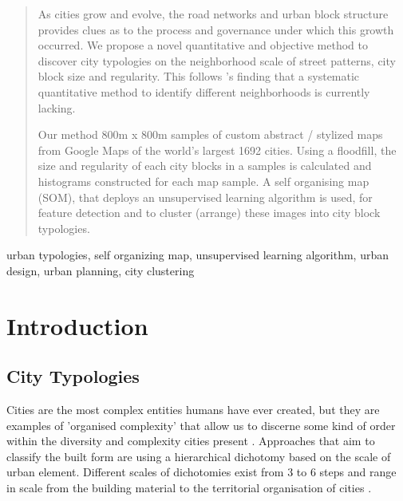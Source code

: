 \documentclass[final,3p,times,authoryear]{elsarticle}
\begin{document}
\begin{frontmatter}
\begin{abstract}
As cities grow and evolve, the road networks and urban block structure provides clues as to the process and governance under which this growth occurred. We propose a novel quantitative and objective method to discover city typologies on the neighborhood scale of street patterns, city block size and regularity. This follows \cite{Louf2014a}'s finding that a systematic quantitative method to identify different neighborhoods is currently lacking. 

Our method 800m x 800m samples of custom abstract / stylized maps from Google Maps of the world's largest 1692 cities. Using a floodfill, the size and regularity of each city blocks in a samples is calculated and histograms constructed for each map sample. A self organising map (SOM), that deploys an unsupervised learning algorithm is used, for feature detection and to cluster (arrange) these images into city block typologies. 


\end{abstract}

\begin{keyword}
urban typologies, self organizing map, unsupervised learning algorithm, urban design, urban planning, city clustering



\end{keyword}

\end{frontmatter}







\section{Introduction}\label{sec:introduction}


\subsection{City Typologies}\label{sec:introduction2}
Cities are the most complex entities humans have ever created, but they are examples of 'organised complexity' that allow us to discerne some kind of order within the diversity and complexity cities present \citep{Kropf2014}. Approaches that aim to classify the built form are using a hierarchical dichotomy based on the scale of urban element. Different scales of dichotomies exist from 3 to 6 steps and range in scale from the building material to the territorial organisation of cities  \citep{Lynch1981,Conzen1960,Caniggi1979,Castex1980,Mouden1988,Allain2004}.
\end{document}
